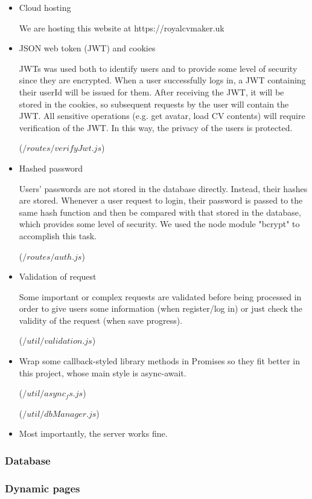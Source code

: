 \documentclass[11pt]{article}
\begin{document}
\begin{spacing}{1.0}
\begin{itemize}
	\item Cloud hosting
	
	We are hosting this website at https://royalcvmaker.uk
	
	\item JSON web token (JWT) and cookies
	
	JWTs was used both to identify users and to provide some level of security since they are encrypted.
	When a user successfully logs in, a JWT containing their userId will be issued for them. After receiving the JWT, it will be stored in the cookies, so subsequent requests by the user will contain the JWT. All sensitive operations (e.g. get avatar, load CV contents) will require verification of the JWT. In this way, the privacy of the users is protected.
	
	($/routes/verifyJwt.js$)

	\item Hashed password
	
	Users' passwords are not stored in the database directly. Instead, their hashes are stored. Whenever a user request to login, their password is passed to the same hash function and then be compared with that stored in the database, which provides some level of security. We used the node module "bcrypt" to accomplish this task.
	
	($/routes/auth.js$)
	
	\item Validation of request
	
	Some important or complex requests are validated before being processed in order to give users some information (when register/log in) or just check the validity of the request (when save progress). 
	
	($/util/validation.js$)
	
	\item Wrap some callback-styled library methods in Promises so they fit better in this project, whose main style is async-await.
	
	($/util/async_fs.js$)
	
	($/util/dbManager.js$)
	
	\item Most importantly, the server works fine.
	
		\end{itemize}
	\subsubsection{Database}
	\subsubsection{Dynamic pages}
	

\end{spacing}
\end{document}
